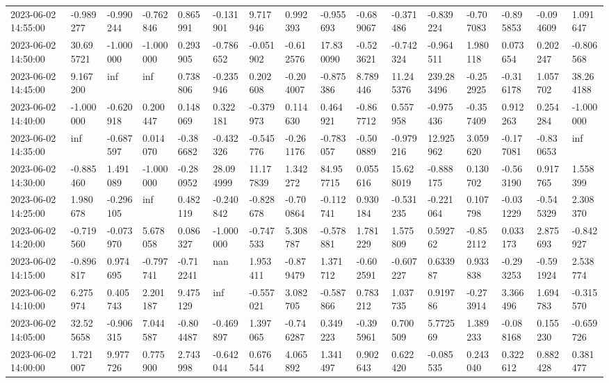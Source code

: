 \documentclass[
  letterpaper,
  DIV=11,
  numbers=noendperiod]{scrartcl}
\begin{document}
\begin{longtable}[]{@{}llllllllllllllll@{}}
2023-06-02 14:55:00 & -0.989277 & -0.990244 & -0.762846 & 0.865991 &
-0.131901 & 9.717946 & 0.992393 & -0.955693 & -0.689067 & -0.371486 &
-0.839224 & -0.707083 & -0.895853 & -0.094609 & 1.091647 \\
2023-06-02 14:50:00 & 30.695721 & -1.000000 & -1.000000 & 0.293905 &
-0.786652 & -0.051902 & -0.612576 & 17.830090 & -0.523621 & -0.742324 &
-0.964511 & 1.980118 & 0.073654 & 0.202247 & -0.806568 \\
2023-06-02 14:45:00 & 9.167200 & inf & inf & 0.738806 & -0.235946 &
0.202608 & -0.204007 & -0.875386 & 8.789446 & 11.245376 & 239.283496 &
-0.252925 & -0.316178 & 1.057702 & 38.264188 \\
2023-06-02 14:40:00 & -1.000000 & -0.620918 & 0.200447 & 0.148069 &
0.322181 & -0.379973 & 0.114630 & 0.464921 & -0.867712 & 0.557958 &
-0.975436 & -0.357409 & 0.912263 & 0.254284 & -1.000000 \\
2023-06-02 14:35:00 & inf & -0.687597 & 0.014070 & -0.386682 & -0.432326
& -0.545776 & -0.261176 & -0.783057 & -0.500889 & -0.979216 & 12.925962
& 3.059620 & -0.177081 & -0.830653 & inf \\
2023-06-02 14:30:00 & -0.885460 & 1.491089 & -1.000000 & -0.280952 &
28.094999 & 11.177839 & 1.342272 & 84.957715 & 0.055616 & 15.628019 &
-0.888175 & 0.130702 & -0.563190 & 0.917765 & 1.558399 \\
2023-06-02 14:25:00 & 1.980678 & -0.296105 & inf & 0.482119 & -0.240842
& -0.828678 & -0.700864 & -0.112741 & 0.930184 & -0.531235 & -0.221064 &
0.107798 & -0.031229 & -0.545329 & 2.308370 \\
2023-06-02 14:20:00 & -0.719560 & -0.073970 & 5.678058 & 0.086327 &
-1.000000 & -0.747533 & 5.308787 & -0.578881 & 1.781229 & 1.575809 &
0.592762 & -0.852112 & 0.033173 & 2.875693 & -0.842927 \\
2023-06-02 14:15:00 & -0.896817 & 0.974695 & -0.797741 & -0.712241 & nan
& 1.953411 & -0.879479 & 1.371712 & -0.602591 & -0.607227 & 0.633987 &
0.933838 & -0.293253 & -0.591924 & 2.538774 \\
2023-06-02 14:10:00 & 6.275974 & 0.405743 & 2.201187 & 9.475129 & inf &
-0.557021 & 3.082705 & -0.587866 & 0.783212 & 1.037735 & 0.919786 &
-0.273914 & 3.366496 & 1.694783 & -0.315570 \\
2023-06-02 14:05:00 & 32.525658 & -0.906315 & 7.044587 & -0.804487 &
-0.469897 & 1.397065 & -0.746287 & 0.349223 & -0.395961 & 0.700509 &
5.772569 & 1.389233 & -0.088168 & 0.155230 & -0.659726 \\
2023-06-02 14:00:00 & 1.721007 & 9.977726 & 0.775900 & 2.743998 &
-0.642044 & 0.676544 & 4.065892 & 1.341497 & 0.902643 & 0.622420 &
-0.085535 & 0.243040 & 0.322612 & 0.882428 & 0.381477 \\
\bottomrule()
\end{longtable}
\end{document}
